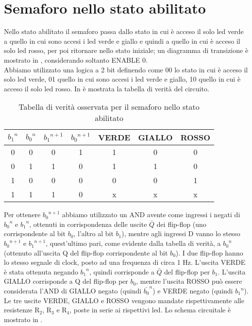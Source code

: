 \section{Semaforo nello stato abilitato}
Nello stato abilitato il semaforo passa dallo stato in cui è acceso il solo led verde a quello in cui sono accesi i led verde e giallo e quindi a quello in cui è acceso il solo led rosso, per poi ritornare nello stato iniziale; un diagramma di transizione è mostrato in , considerando soltanto ENABLE 0.\\
Abbiamo utilizzato una logica a 2 bit definendo come 00 lo stato in cui è acceso il solo led verde, 01 quello in cui sono accesi i led verde e giallo, 10 quello in cui è acceso il solo led rosso. In  è mostrata la tabella di verità del circuito.\\
\begin{table}[h]
	\centering
	\begin{tabular}{*{7}{S[table-figures-exponent = 2]}}
		{${b_1}^{n}$} & {${b_0}^{n}$} & {${b_1}^{n+1}$} & {${b_0}^{n+1}$} & {VERDE} & {GIALLO} & {ROSSO} \\
		 & 0 & 0 & 1 & 1 & 0 & 0\\
           0 & 1 & 1 & 0 & 1 & 1 & 0\\
           1 & 0 & 0 & 0 & 0 & 0 & 1\\
           1 & 1 & 1 & 0 & x & x & x\\
 	\end{tabular}
	\caption{ Tabella di verità osservata per il semaforo nello stato abilitato}
	\label{t:Tabella-verità}
\end{table}
Per ottenere ${b_0}^{n+1}$ abbiamo utilizzato un AND avente come ingressi i negati di ${b_0}^{n}$ e ${b_1}^{n}$, ottenuti in corrispondenza delle uscite $\bar  Q$ dei flip-flop (uno corrispondente al bit $b_0$, l'altro al bit $b_1$), mentre agli ingressi D vanno lo stesso ${b_0}^{n+1}$ e ${b_1}^{n+1}$, quest'ultimo pari, come evidente dalla tabella di verità, a ${b_0}^{n}$ (ottenuto all'uscita Q del flip-flop corrispondente al bit $b_0$). I due flip-flop hanno lo stesso segnale di clock, posto ad una frequenza di circa 1 Hz. L'uscita VERDE è stata ottenuta negando ${b_1}^{n}$, quindi corrisponde a $\bar Q$ del flip-flop per $b_1$. L'uscita GIALLO corrisponde a Q del flip-flop per $b_0$, mentre l'uscita ROSSO può essere considerata l'AND di GIALLO negato (quindi ${\bar{b_0}^{n}}$) e VERDE negato (quindi ${b_1}^{n}$). Le tre uscite VERDE, GIALLO e ROSSO vengono mandate rispettivamente alle resistenze R$_2$, R$_3$ e R$_4$, poste in serie ai rispettivi led. Lo schema circuitale è mostrato in .\\
